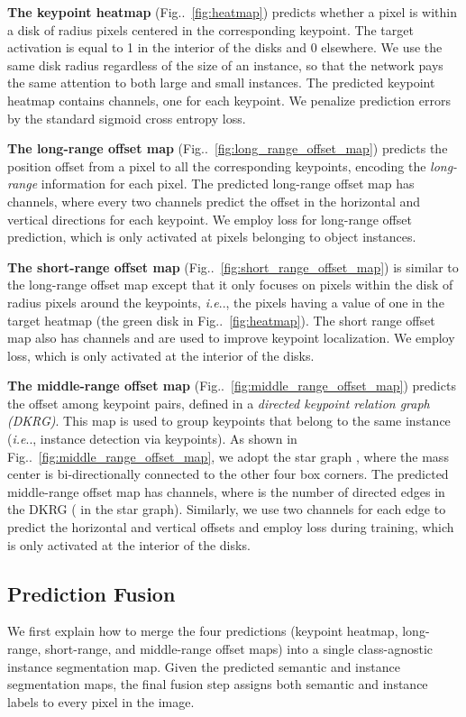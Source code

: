 \documentclass[10pt,twocolumn,letterpaper]{article}
\makeatletter
\def\@onedot{\ifx\@let@token.\else.\null\fi\xspace}
\DeclareRobustCommand\onedot{\futurelet\@let@token\@onedot}
\newcommand{\figref}[1]{Fig\onedot~\ref{#1}}
\def\ie{\emph{i.e}\onedot} \def\Ie{\emph{I.e}\onedot}
\makeatother
\begin{document}
\textbf{The keypoint heatmap} (\figref{fig:heatmap}) predicts whether a pixel is within a disk of radius  pixels centered in the corresponding keypoint. The target activation is equal to 1 in the interior of the disks and 0 elsewhere. We use the same disk radius  regardless of the size of an instance, so that the network pays the same attention to both large and small instances. The predicted keypoint heatmap contains  channels, one for each keypoint. We penalize prediction errors by the standard sigmoid cross entropy loss.

\textbf{The long-range offset map} (\figref{fig:long_range_offset_map}) predicts the position offset from a pixel to all the corresponding keypoints, encoding the \textit{long-range} information for each pixel. The predicted long-range offset map has  channels, where every two channels predict the offset in the horizontal and vertical directions for each keypoint. We employ  loss for long-range offset prediction, which is only activated at pixels belonging to object instances.

\textbf{The short-range offset map} (\figref{fig:short_range_offset_map}) is similar to the long-range offset map except that it only focuses on pixels within the disk of radius  pixels around the keypoints, \ie, the pixels having a value of one in the target heatmap (the green disk in \figref{fig:heatmap}). The short range offset map also has  channels and are used to improve keypoint localization. We employ  loss, which is only activated at the interior of the disks.

\textbf{The middle-range offset map} (\figref{fig:middle_range_offset_map}) predicts the offset among keypoint pairs, defined in a \emph{directed keypoint relation graph (DKRG)}. This map is used to group keypoints that belong to the same instance (\ie, instance detection via keypoints). As shown in \figref{fig:middle_range_offset_map}, we adopt the star graph \cite{veksler2008star}, where the mass center is bi-directionally connected to the other four box corners. The predicted middle-range offset map has  channels, where  is the number of directed edges in the DKRG ( in the star graph). Similarly, we use two channels for each edge to predict the horizontal and vertical offsets and employ  loss during training, which is only activated at the interior of the disks.

\subsection{Prediction Fusion}
\label{sec:fusion}
We first explain how to merge the four predictions (keypoint heatmap, long-range, short-range, and middle-range offset maps) into a single class-agnostic instance segmentation map. Given the predicted semantic and instance segmentation maps, the final fusion step assigns both semantic and instance labels to every pixel in the image.
\end{document}
